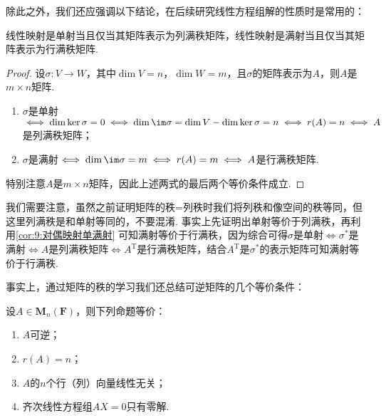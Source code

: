 除此之外，我们还应强调以下结论，在后续研究线性方程组解的性质时是常用的：
\begin{theorem}\label{thm:11:单满射与行列秩}
    线性映射是单射当且仅当其矩阵表示为列满秩矩阵，线性映射是满射当且仅当其矩阵表示为行满秩矩阵.
\end{theorem}

\begin{proof}
    设$\sigma:V\to W$，其中$\dim V=n$，$\dim W=m$，且$\sigma$的矩阵表示为$A$，则$A$是$m\times n$矩阵.
    \begin{enumerate}
        \item $\sigma$是单射$\iff\dim\ker\sigma=0\iff \dim\im\sigma=\dim V-\dim\ker\sigma=n\iff r(A)=n\iff A$是列满秩矩阵；

        \item $\sigma$是满射$\iff\dim\im\sigma=m\iff r(A)=m\iff A$是行满秩矩阵.
    \end{enumerate}
    特别注意$A$是$m\times n$矩阵，因此上述两式的最后两个等价条件成立.
\end{proof}

我们需要注意，虽然之前证明矩阵的秩=列秩时我们将列秩和像空间的秩等同，但这里列满秩是和单射等同的，不要混淆. 事实上先证明出单射等价于列满秩，再利用\autoref{cor:9:对偶映射单满射} 可知满射等价于行满秩，因为综合可得$\sigma$是单射$\iff\sigma^*$是满射$\iff A$是列满秩矩阵$\iff A^\mathrm{T}$是行满秩矩阵，结合$A^\mathrm{T}$是$\sigma^*$的表示矩阵可知满射等价于行满秩.

事实上，通过矩阵的秩的学习我们还总结可逆矩阵的几个等价条件：
\begin{theorem}\label{thm:11:可逆等价条件}
    设$A \in \mathbf{M}_n(\mathbf{F})$，则下列命题等价：
    \begin{enumerate}[label=(\arabic*)]
        \item \label{item:11:可逆等价条件:1}
              $A$可逆；

        \item \label{item:11:可逆等价条件:2}
              $r(A)=n$；

        \item \label{item:11:可逆等价条件:3}
              $A$的$n$个行（列）向量线性无关；

        \item \label{item:11:可逆等价条件:4}
              齐次线性方程组$AX=0$只有零解.
    \end{enumerate}
\end{theorem}

